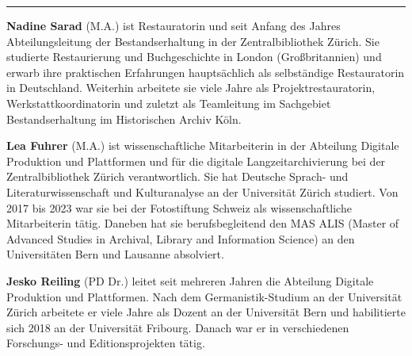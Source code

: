 \begin{center}\rule{0.5\linewidth}{0.5pt}\end{center}

\textbf{Nadine Sarad} (M.A.) ist Restauratorin und seit Anfang des
Jahres Abteilungsleitung der Bestandserhaltung in der Zentralbibliothek
Zürich. Sie studierte Restaurierung und Buchgeschichte in London
(Großbritannien) und erwarb ihre praktischen Erfahrungen hauptsächlich
als selbständige Restauratorin in Deutschland. Weiterhin arbeitete sie
viele Jahre als Projektrestauratorin, Werkstattkoordinatorin und zuletzt
als Teamleitung im Sachgebiet Bestandserhaltung im Historischen Archiv
Köln.

\textbf{Lea Fuhrer} (M.A.) ist wissenschaftliche Mitarbeiterin in der
Abteilung Digitale Produktion und Plattformen und für die digitale
Langzeitarchivierung bei der Zentralbibliothek Zürich verantwortlich.
Sie hat Deutsche Sprach- und Literaturwissenschaft und Kulturanalyse an
der Universität Zürich studiert. Von 2017 bis 2023 war sie bei der
Fotostiftung Schweiz als wissenschaftliche Mitarbeiterin tätig. Daneben
hat sie berufsbegleitend den MAS ALIS (Master of Advanced Studies in
Archival, Library and Information Science) an den Universitäten Bern und
Lausanne absolviert.

\textbf{Jesko Reiling} (PD Dr.) leitet seit mehreren Jahren die
Abteilung Digitale Produktion und Plattformen. Nach dem
Germanistik-Studium an der Universität Zürich arbeitete er viele Jahre
als Dozent an der Universität Bern und habilitierte sich 2018 an der
Universität Fribourg. Danach war er in verschiedenen Forschungs- und
Editionsprojekten tätig.
